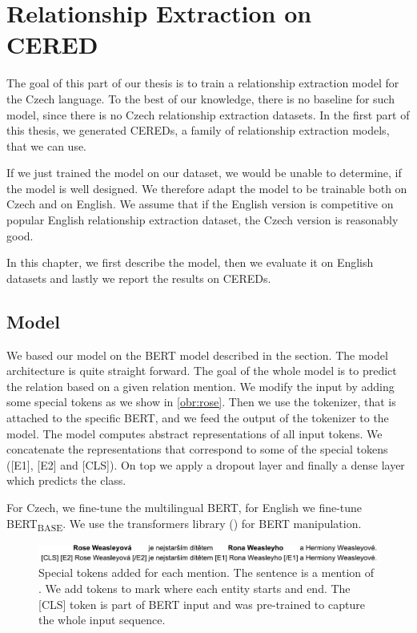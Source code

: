 \chapter{Relationship Extraction on CERED}
The goal of this part of our thesis is to train a relationship extraction model for the Czech language. To the best of our knowledge, there is no baseline for such model, since there is no Czech relationship extraction datasets. In the first part of this thesis, we generated CEREDs, a family of relationship extraction models, that we can use.

If we just trained the model on our dataset, we would be unable to determine, if the model is well designed. We therefore adapt the model to be trainable both on Czech and on English. We assume that if the English version is competitive on popular English relationship extraction dataset, the Czech version is reasonably good.

In this chapter, we first describe the model, then we evaluate it on English datasets and lastly we report the results on CEREDs.

\section{Model}

We based our model on the BERT model described in the  section. The model architecture is quite straight forward. The goal of the whole model is to predict the relation based on a given relation mention. We modify the input by adding some special tokens as we show in \autoref{obr:rose}. Then we use the tokenizer, that is attached to the specific BERT, and we feed the output of the tokenizer to the model. The model computes abstract representations of all input tokens. We concatenate the representations that correspond to some of the special tokens ([E1], [E2] and [CLS]). On top we apply a dropout layer and finally a dense layer which predicts the class. 

For Czech, we fine-tune the multilingual BERT, for English we fine-tune BERT\textsubscript{BASE}. We use the transformers library (\cite{Wolf2019HuggingFacesTS}) for BERT manipulation.

\begin{figure}[h]
\includegraphics[width = 1\textwidth]{./img/rose}
\caption{Special tokens added for each mention. The sentence is a mention of . We add tokens to mark where each entity starts and end. The [CLS] token is part of BERT input and was pre-trained to capture the whole input sequence.}
\label{obr:rose}
\end{figure}



